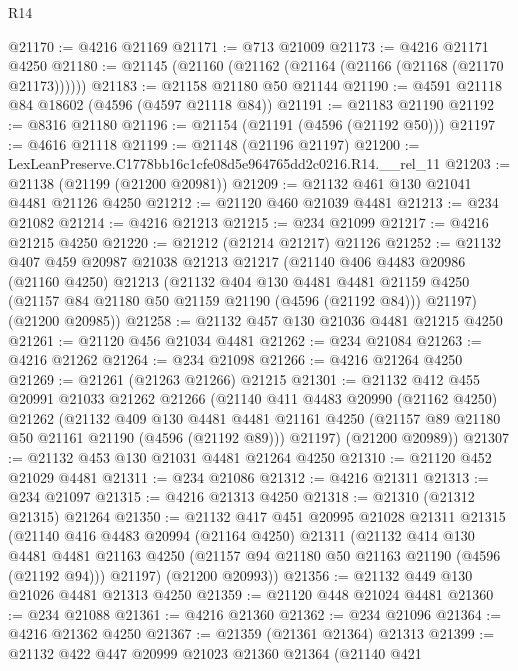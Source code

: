 \begin{lexlean}{R14}
\begin{coremodule}
@21170 := @4216 @21169
@21171 := @713 @21009
@21173 := @4216 @21171 @4250
@21180 := @21145 (@21160 (@21162 (@21164 (@21166 (@21168 (@21170 @21173))))))
@21183 := @21158 @21180 @50 @21144
@21190 := @4591 @21118 @84 @18602 (@4596 (@4597 @21118 @84))
@21191 := @21183 @21190
@21192 := @8316 @21180
@21196 := @21154 (@21191 (@4596 (@21192 @50)))
@21197 := @4616 @21118
@21199 := @21148 (@21196 @21197)
@21200 := LexLeanPreserve.C1778bb16c1cfe08d5e964765dd2c0216.R14.__rel_11
@21203 := @21138 (@21199 (@21200 @20981))
@21209 := @21132 @461 @130 @21041 @4481 @21126 @4250
@21212 := @21120 @460 @21039 @4481
@21213 := @234 @21082
@21214 := @4216 @21213
@21215 := @234 @21099
@21217 := @4216 @21215 @4250
@21220 := @21212 (@21214 @21217) @21126
@21252 := @21132
    @407
    @459
    @20987
    @21038
    @21213
    @21217
    (@21140
      @406
      @4483
      @20986
      (@21160 @4250)
      @21213
      (@21132
        @404
        @130
        @4481
        @4481
        @21159
        @4250
        (@21157 @84 @21180 @50 @21159 @21190 (@4596 (@21192 @84)))
        @21197)
      (@21200 @20985))
@21258 := @21132 @457 @130 @21036 @4481 @21215 @4250
@21261 := @21120 @456 @21034 @4481
@21262 := @234 @21084
@21263 := @4216 @21262
@21264 := @234 @21098
@21266 := @4216 @21264 @4250
@21269 := @21261 (@21263 @21266) @21215
@21301 := @21132
    @412
    @455
    @20991
    @21033
    @21262
    @21266
    (@21140
      @411
      @4483
      @20990
      (@21162 @4250)
      @21262
      (@21132
        @409
        @130
        @4481
        @4481
        @21161
        @4250
        (@21157 @89 @21180 @50 @21161 @21190 (@4596 (@21192 @89)))
        @21197)
      (@21200 @20989))
@21307 := @21132 @453 @130 @21031 @4481 @21264 @4250
@21310 := @21120 @452 @21029 @4481
@21311 := @234 @21086
@21312 := @4216 @21311
@21313 := @234 @21097
@21315 := @4216 @21313 @4250
@21318 := @21310 (@21312 @21315) @21264
@21350 := @21132
    @417
    @451
    @20995
    @21028
    @21311
    @21315
    (@21140
      @416
      @4483
      @20994
      (@21164 @4250)
      @21311
      (@21132
        @414
        @130
        @4481
        @4481
        @21163
        @4250
        (@21157 @94 @21180 @50 @21163 @21190 (@4596 (@21192 @94)))
        @21197)
      (@21200 @20993))
@21356 := @21132 @449 @130 @21026 @4481 @21313 @4250
@21359 := @21120 @448 @21024 @4481
@21360 := @234 @21088
@21361 := @4216 @21360
@21362 := @234 @21096
@21364 := @4216 @21362 @4250
@21367 := @21359 (@21361 @21364) @21313
@21399 := @21132
    @422
    @447
    @20999
    @21023
    @21360
    @21364
    (@21140
      @421

\end{coremodule}
\end{lexlean}
